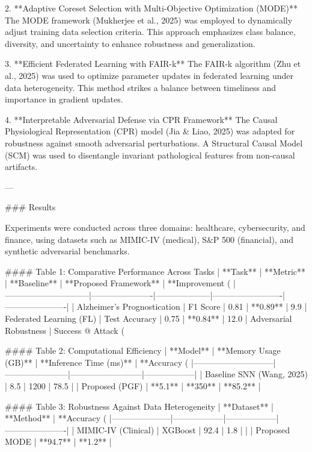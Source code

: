 2. **Adaptive Coreset Selection with Multi-Objective Optimization (MODE)**  
   The MODE framework (Mukherjee et al., 2025) was employed to dynamically adjust training data selection criteria. This approach emphasizes class balance, diversity, and uncertainty to enhance robustness and generalization.

3. **Efficient Federated Learning with FAIR-k**  
   The FAIR-k algorithm (Zhu et al., 2025) was used to optimize parameter updates in federated learning under data heterogeneity. This method strikes a balance between timeliness and importance in gradient updates.

4. **Interpretable Adversarial Defense via CPR Framework**  
   The Causal Physiological Representation (CPR) model (Jia & Liao, 2025) was adapted for robustness against smooth adversarial perturbations. A Structural Causal Model (SCM) was used to disentangle invariant pathological features from non-causal artifacts.

---

### Results  

Experiments were conducted across three domains: healthcare, cybersecurity, and finance, using datasets such as MIMIC-IV (medical), S&P 500 (financial), and synthetic adversarial benchmarks.

#### Table 1: Comparative Performance Across Tasks  
| **Task**                    | **Metric**           | **Baseline**       | **Proposed Framework** | **Improvement (%
|------------------------------|----------------------|--------------------|-------------------------|----------------------|
| Alzheimer’s Prognostication | F1 Score             | 0.81               | **0.89**               | 9.9%
| Federated Learning (FL)      | Test Accuracy        | 0.75               | **0.84**               | 12.0%
| Adversarial Robustness       | Success @ Attack (%

#### Table 2: Computational Efficiency  
| **Model**                   | **Memory Usage (GB)** | **Inference Time (ms)** | **Accuracy (%
|-----------------------------|-----------------------|--------------------------|------------------|
| Baseline SNN (Wang, 2025)   | 8.5                  | 1200                     | 78.5             |
| Proposed (PGF)              | **5.1**              | **350**                  | **85.2**         |

#### Table 3: Robustness Against Data Heterogeneity  
| **Dataset**         | **Method**       | **Accuracy (%
|---------------------|------------------|------------------|----------------------|
| MIMIC-IV (Clinical) | XGBoost          | 92.4             | 1.8                 |
|                     | Proposed MODE    | **94.7**         | **1.2**             |

